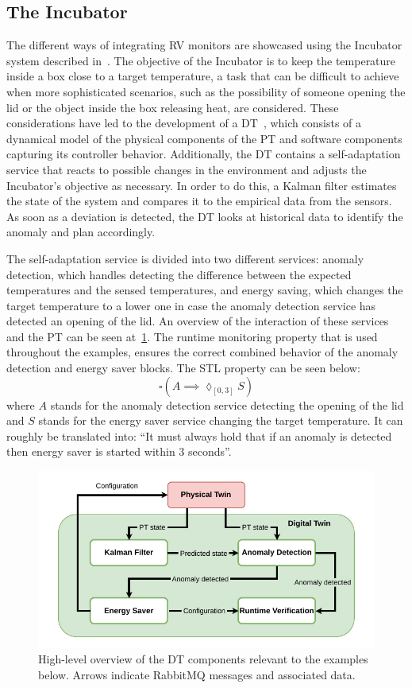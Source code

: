 \subsection{The Incubator}
The different ways of integrating RV monitors are showcased using the Incubator system described in~\cite{Feng&21c}.
The objective of the Incubator is to keep the temperature inside a box close to a target temperature, a task that can be difficult to achieve when more sophisticated scenarios, such as the possibility of someone opening the lid or the object inside the box releasing heat, are considered.
These considerations have led to the development of a DT~\cite{Feng2022}, which consists of a dynamical model of the physical components of the PT and software components capturing its controller behavior. Additionally, the DT contains a self-adaptation service that reacts to possible changes in the environment and adjusts the Incubator's objective as necessary. In order to do this, a Kalman filter estimates the state of the system and compares it to the empirical data from the sensors. As soon as a deviation is detected, the DT looks at historical data to identify the anomaly and plan accordingly.

The self-adaptation service is divided into two different services: anomaly detection, which handles detecting the difference between the expected temperatures and the sensed temperatures, and energy saving, which changes the target temperature to a lower one in case the anomaly detection service has detected an opening of the lid.
An overview of the interaction of these services and the PT can be seen at~\cref{fig:incubator}.
The runtime monitoring property that is used throughout the examples, ensures the correct combined behavior of the anomaly detection and energy saver blocks.
The STL property can be seen below:
\begin{equation}
	\square(A\implies \lozenge_{[0,3]} S)
\end{equation}
where $A$ stands for the anomaly detection service detecting the opening of the lid and $S$ stands for the energy saver service changing the target temperature.
It can roughly be translated into: ``It must always hold that if an anomaly is detected then energy saver is started within 3 seconds''.

\begin{figure}[ht]
	\centering
	\includegraphics[width=\columnwidth]{images/incubator_anomaly_HL.pdf}
	\caption{High-level overview of the DT components relevant to the examples below. Arrows indicate RabbitMQ messages and associated data.}
	\label{fig:incubator}
\end{figure}
